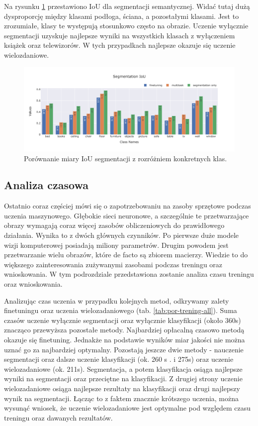 Na rysunku \ref{fig:segmentation-iou} przestawiono IoU dla segmentacji semantycznej. Widać tutaj dużą dysproporcję między klasami podłoga, ściana, a pozostałymi klasami. Jest to zrozumiałe, klasy te występują stosunkowo często na obrazie. Uczenie wyłącznie segmentacji uzyskuje najlepsze wyniki na wszystkich klasach z wyłączeniem książek oraz telewizorów. W tych przypadkach najlepsze okazuje się uczenie wielozdaniowe.

\begin{figure}[ht!]
    \centering
    \includegraphics[width=\textwidth]{result_imgs_sorted/Segmentation-IoU.jpeg}
    \caption{Porównanie miary IoU segmentacji z rozróżniem konkretnych klas.}
    \label{fig:segmentation-iou}
    
\end{figure}
\subsection{Analiza czasowa}
Ostatnio coraz częściej mówi się o zapotrzebowaniu na zasoby sprzętowe podczas uczenia maszynowego. Głębokie sieci neuronowe, a szczególnie te przetwarzające obrazy wymagają coraz więcej zasobów obliczeniowych do prawidłowego działania. Wynika to z dwóch głównych czynników. Po pierwsze duże modele wizji komputerowej posiadają miliony parametrów. Drugim powodem jest przetwarzanie wielu obrazów, które de facto są zbiorem macierzy. Wiedzie to do większego zainteresowania zużywanymi zasobami podczas treningu oraz wnioskowania. W tym podrozdziale przedstawiona zostanie analiza czasu treningu oraz wnioskowania.

Analizując czas uczenia w przypadku kolejnych metod, odkrywamy zalety finetuningu oraz uczenia wielozadaniowego (tab. \ref{tab:por-trening-all}). Suma czasów uczenie wyłącznie segmentacji oraz wyłącznie klasyfikacji (około 360s) znacząco przewyższa pozostałe metody. Najbardziej opłacalną czasowo metodą okazuje się finetuning. Jednakże na podstawie wyników miar jakości nie można uznać go za najbardziej optymalny. Pozostają jeszcze dwie metody - nauczenie segmentacji oraz dalsze uczenie klasyfikacji (ok. 260 s . i 275s) oraz uczenie wielozadaniowe (ok. 211s). Segmentacja, a potem klasyfikacja osiąga najlepsze wyniki na segmentacji oraz przeciętne na klasyfikacji. Z drugiej strony uczenie wielozadaniowe osiąga najlepsze rezultaty na klasyfikacji oraz drugi najlepszy wynik na segmentacji. Łącząc to z faktem znacznie krótszego uczenia, można wysunąć wniosek, że uczenie wielozadaniowe jest optymalne pod względem czasu treningu oraz dawanych rezultatów.




